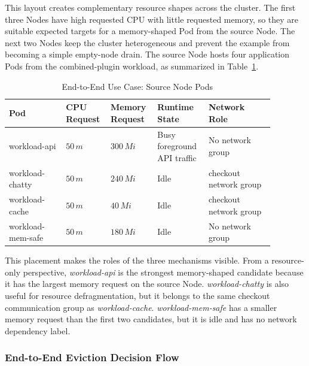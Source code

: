 This layout creates complementary resource shapes across the cluster. The first three Nodes have high requested CPU with little requested memory, so they are suitable expected targets for a memory-shaped Pod from the source Node. The next two Nodes keep the cluster heterogeneous and prevent the example from becoming a simple empty-node drain. The source Node hosts four application Pods from the combined-plugin workload, as summarized in Table~\ref{tab:e2e_source_pods}.

\begin{table}[tbp]
    \centering
    \caption{End-to-End Use Case: Source Node Pods}
    \label{tab:e2e_source_pods}
    \renewcommand{\arraystretch}{1.2}
    \scriptsize
    \setlength{\tabcolsep}{2pt}
    \begin{tabular}{@{}>{\raggedright\arraybackslash}p{0.20\linewidth}
                    >{\centering\arraybackslash}p{0.12\linewidth}
                    >{\centering\arraybackslash}p{0.15\linewidth}
                    >{\raggedright\arraybackslash}p{0.18\linewidth}
                    >{\raggedright\arraybackslash}p{0.23\linewidth}@{}}
        \toprule
        \textbf{Pod} & \textbf{CPU Request} & \textbf{Memory Request} & \textbf{Runtime State} & \textbf{Network Role} \\
        \midrule
        workload-api & $50\,m$ & $300\,Mi$ & Busy foreground API traffic & No network group \\
        workload-chatty & $50\,m$ & $240\,Mi$ & Idle & checkout network group \\
        workload-cache & $50\,m$ & $40\,Mi$ & Idle & checkout network group \\
        workload-mem-safe & $50\,m$ & $180\,Mi$ & Idle & No network group \\
        \bottomrule
    \end{tabular}
\end{table}

This placement makes the roles of the three mechanisms visible. From a resource-only perspective, \textit{workload-api} is the strongest memory-shaped candidate because it has the largest memory request on the source Node. \textit{workload-chatty} is also useful for resource defragmentation, but it belongs to the same checkout communication group as \textit{workload-cache}. \textit{workload-mem-safe} has a smaller memory request than the first two candidates, but it is idle and has no network dependency label.

\subsubsection{End-to-End Eviction Decision Flow}

